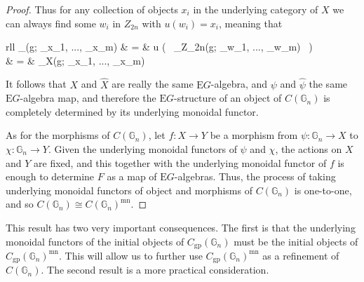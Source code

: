 \documentclass{amsart} %
\newenvironment{eq*}{\begin{equation*}}{\end{equation*}}
\begin{document}
\begin{proof}
Thus for any collection of objects $x_i$ in the underlying category of $X$ we can always find some $w_i$ in $Z_{2n}$ with $u(w_i) = x_i$, meaning that
\begin{eq*}\begin{array}{rll}
		\alpha_{}(g; _{x_1}, ..., _{x_m}) & = & u \big( \, \alpha_{Z_{2n}}(g; _{w_1}, ..., _{w_m}) \, \big) \\
		& = & \alpha_{X}(g; _{x_1}, ..., _{x_m}) 
		\end{array}
\end{eq*}
It follows that $X$ and $\hat{X}$ are really the same $\mathrm{E}G$-algebra, and $\psi$ and $\hat{\psi}$ the same $\mathrm{E}G$-algebra map, and therefore the $\mathrm{E}G$-structure of an object of $C(\mathbb{G}_n)$ is completely determined by its underlying monoidal functor.

As for the morphisms of $C(\mathbb{G}_n)$, let $f: X \to Y$ be a morphism from $\psi: \mathbb{G}_n \to X$ to $\chi: \mathbb{G}_n \to Y$. Given the underlying monoidal functors of $\psi$ and $\chi$, the actions on $X$ and $Y$ are fixed, and this together with the underlying monoidal functor of $f$ is enough to determine $F$ as a map of $\mathrm{E}G$-algebras. Thus, the process of taking underlying monoidal functors of object and morphisms of $C(\mathbb{G}_n)$ is one-to-one, and so $C(\mathbb{G}_n) \cong C(\mathbb{G}_n)^{\mathrm{mn}}$.
\end{proof}

This result has two very important consequences. The first is that the underlying monoidal functors of the initial objects of $C_{\mathrm{gp}}(\mathbb{G}_n)$ must be the initial objects of $C_{\mathrm{gp}}(\mathbb{G}_n)^{\mathrm{mn}}$. This will allow us to further use $C_{\mathrm{gp}}(\mathbb{G}_n)^{\mathrm{mn}}$ as a refinement of $C(\mathbb{G}_n)$. The second result is a more practical consideration.
\end{document}
